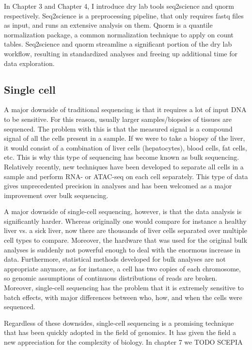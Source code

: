 In Chapter 3 and Chapter 4, I introduce dry lab tools seq2science and qnorm respectively. Seq2science is a preprocessing pipeline, that only requires fastq files as input, and runs an extensive analysis on them. Qnorm is a quantile normalization package, a common normalization technique to apply on count tables. Seq2science and qnorm streamline a significant portion of the dry lab workflow, resulting in standardized analyses and freeing up additional time for data exploration.

\subsection{Single cell}

A major downside of traditional sequencing is that it requires a lot of input DNA to be sensitive. For this reason, usually larger samples/biopsies of tissues are sequenced. The problem with this is that the measured signal is a compound signal of all the cells present in a sample. If we were to take a biopsy of the liver, it would consist of a combination of liver cells (hepatocytes), blood cells, fat cells, etc. This is why this type of sequencing has become known as bulk sequencing. Relatively recently, new techniques have been developed to separate all cells in a sample and perform RNA- or ATAC-seq on each cell separately\cite{Buenrostro2015_sc,Tang2009}. This type of data gives unprecedented precision in analyses and has been welcomed as a major improvement over bulk sequencing.

A major downside of single-cell sequencing, however, is that the data analysis is significantly harder. Whereas originally one would compare for instance a healthy liver vs. a sick liver, now there are thousands of liver cells separated over multiple cell types to compare. Moreover, the hardware that was used for the original bulk analyses is suddenly not powerful enough to deal with the enormous increase in data. Furthermore, statistical methods developed for bulk analyses are not appropriate anymore, as for instance, a cell has two copies of each chromosome, so genomic assumptions of continuous distributions of reads are broken. Moreover, single-cell sequencing has the problem that it is extremely sensitive to batch effects, with major differences between who, how, and when the cells were sequenced.

Regardless of these downsides, single-cell sequencing is a promising technique that has been quickly adopted in the field of genomics. It has given the field a new appreciation for the complexity of biology. In chapter 7 we TODO SCEPIA

